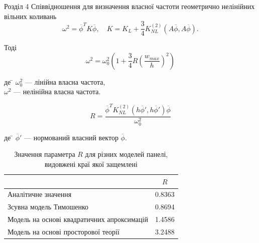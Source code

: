 \documentclass[8pt]{beamer}
\numberwithin{figure}{section}
\numberwithin{equation}{section}
\numberwithin{table}{section}
\begin{document}
\begin{frame}{Розділ 4}
Співвідношення для визначення власної частоти геометрично нелінійних вільних коливань
\begin{equation}
\omega^2=\overline{\phi}^T K \overline{\phi}, \quad K = K_L + \frac34 K_{NL}^{(2)}\left( A\overline{\phi},A\overline{\phi} \right).
\end{equation}

Тоді
\begin{equation}
\omega^2=\omega_0^2\left(1+\frac{3}{4}R\left(\frac{w_{max}}{h}\right)^2\right)
\end{equation}

\begin{tabbing}
де \= $\omega_0^2$ --- лінійна власна частота,\\
\> $\omega^2$ --- нелінійна власна частота.
\end{tabbing}

\begin{equation}
R=\frac{\overline{\phi}^T K_{NL}^{(2)}\left( h\overline{\phi}',h\overline{\phi}' \right) \overline{\phi}}{\omega_0^2}
\end{equation}

\begin{tabbing}
де \= $\overline{\phi}'$ --- нормований власний вектор $\overline{\phi}$.
\end{tabbing}

\begin{table}[h!]
\centering
 \begin{tabular}{| l | c |} 
 \hline
 & $R$ \\ 
 \hline
 Аналітичне значення & 0.8363 \\ 
 \hline
 Зсувна модель Тимошенко & 0.8694 \\ 
 \hline
 Модель на основі квадратичних апроксимацій & 1.4586 \\ 
 \hline
 Модель на основі просторової теорії & 3.2488 \\
 \hline
\end{tabular}
\caption{Значення параметра $R$ для різних моделей панелі, видовжені краї якої защемлені}
\label{table:1}
\end{table}


\end{frame}
\end{document}

